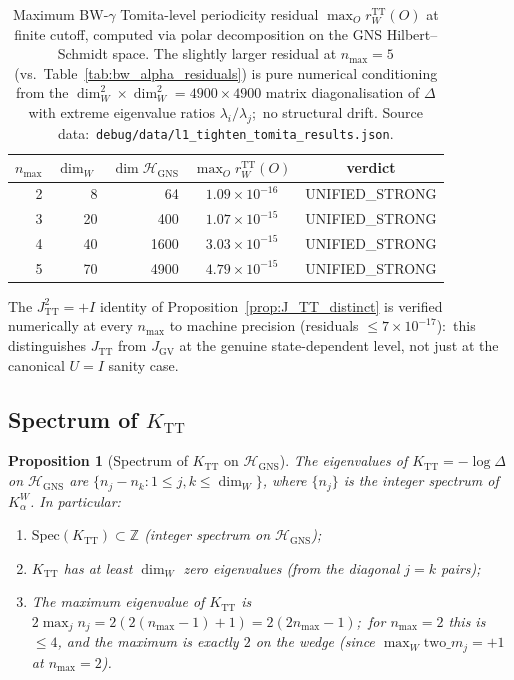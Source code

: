 \documentclass[11pt,a4paper]{article}
\theoremstyle{plain}
\newtheorem{proposition}[theorem]{Proposition}
\theoremstyle{definition}
\newcommand{\nmax}{n_{\max}}
\newcommand{\Hilb}{\mathcal{H}}
\newcommand{\Z}{\mathbb{Z}}
\newcommand{\TT}{\mathrm{TT}}
\newcommand{\GNS}{\mathrm{GNS}}
\begin{document}
\begin{table}[ht]
\centering
\caption{Maximum BW-$\gamma$ Tomita-level periodicity residual
$\max_O r_W^{\TT}(O)$ at finite cutoff, computed via polar
decomposition on the GNS Hilbert--Schmidt space. The slightly larger
residual at $\nmax = 5$ (vs.~Table~\ref{tab:bw_alpha_residuals}) is
pure numerical conditioning from the
$\dim_W^2 \times \dim_W^2 = 4900 \times 4900$ matrix diagonalisation
of $\Delta$ with extreme eigenvalue ratios
$\lambda_i / \lambda_j$;\ no structural drift. Source data:\
\texttt{debug/data/l1\_tighten\_tomita\_results.json}.}
\label{tab:bw_gamma_residuals}
\begin{tabular}{rrrcc}
\toprule
$\nmax$ & $\dim_W$ & $\dim \Hilb_{\GNS}$ &
$\max_O r_W^{\TT}(O)$ &
verdict\\
\midrule
2 & 8  & 64   & $1.09 \times 10^{-16}$ & UNIFIED\_STRONG \\
3 & 20 & 400  & $1.07 \times 10^{-15}$ & UNIFIED\_STRONG \\
4 & 40 & 1600 & $3.03 \times 10^{-15}$ & UNIFIED\_STRONG \\
5 & 70 & 4900 & $4.79 \times 10^{-15}$ & UNIFIED\_STRONG \\
\bottomrule
\end{tabular}
\end{table}

The $J_{\TT}^2 = +I$ identity of Proposition~\ref{prop:J_TT_distinct}
is verified numerically at every $\nmax$ to machine precision
(residuals $\le 7 \times 10^{-17}$):\ this distinguishes $J_{\TT}$
from $J_{\mathrm{GV}}$ at the genuine state-dependent level, not just
at the canonical $U = I$ sanity case.

\subsection{Spectrum of $K_{\TT}$}\label{sec:K_TT_spectrum}

\begin{proposition}[Spectrum of $K_{\TT}$ on $\Hilb_{\GNS}$]
\label{prop:K_TT_spectrum}
The eigenvalues of $K_{\TT} = -\log \Delta$ on $\Hilb_{\GNS}$ are
$\{n_j - n_k : 1 \le j, k \le \dim_W\}$, where $\{n_j\}$ is the integer
spectrum of $K_\alpha^W$. In particular:
\begin{enumerate}\setlength{\itemsep}{2pt}
\item[(a)] $\mathrm{Spec}(K_{\TT}) \subset \Z$ (integer spectrum on
$\Hilb_{\GNS}$);
\item[(b)] $K_{\TT}$ has at least $\dim_W$ zero eigenvalues (from the
diagonal $j = k$ pairs);
\item[(c)] The maximum eigenvalue of $K_{\TT}$ is $2 \max_j n_j =
2(2(\nmax - 1) + 1) = 2(2\nmax - 1)$;\ for $\nmax = 2$ this is $\le 4$,
and the maximum is exactly $2$ on the wedge (since $\max_W
\mathrm{two}\_m_j = +1$ at $\nmax = 2$).
\end{enumerate}
\end{proposition}
\end{document}
